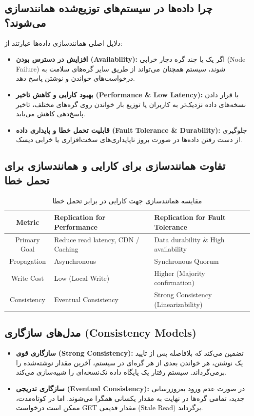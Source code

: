 \documentclass[12pt,a4paper]{article}
\begin{document}
\subsection{چرا داده‌ها در سیستم‌های توزیع‌شده همانندسازی می‌شوند؟}
دلایل اصلی همانندسازی داده‌ها عبارتند از:
\begin{itemize}
    \item \textbf{افزایش در دسترس بودن (Availability):} اگر یک یا چند گره دچار خرابی (Node Failure) شوند، سیستم همچنان می‌تواند از طریق سایر گره‌های سلامت به درخواست‌های خواندن و نوشتن پاسخ دهد.
    \item \textbf{بهبود کارایی و کاهش تاخیر (Performance \& Low Latency):} با قرار دادن نسخه‌های داده نزدیک‌تر به کاربران یا توزیع بار خواندن روی گره‌های مختلف، تاخیر پاسخ‌دهی کاهش می‌یابد.
    \item \textbf{قابلیت تحمل خطا و پایداری داده (Fault Tolerance \& Durability):} جلوگیری از دست رفتن داده‌ها در صورت بروز ناپایداری‌های سخت‌افزاری یا خرابی دیسک.
\end{itemize}

\subsection{تفاوت همانندسازی برای کارایی و همانندسازی برای تحمل خطا}
\begin{table}[H]
\centering
\caption{مقایسه همانندسازی جهت کارایی در برابر تحمل خطا}
\begin{latin}
\begin{tabular}{|c|p{5.5cm}|p{5.5cm}|}
\hline
\textbf{Metric} & \textbf{Replication for Performance} & \textbf{Replication for Fault Tolerance} \\
\hline
Primary Goal & Reduce read latency, CDN / Caching & Data durability \& High availability \\
Propagation & Asynchronous & Synchronous Quorum \\
Write Cost & Low (Local Write) & Higher (Majority confirmation) \\
Consistency & Eventual Consistency & Strong Consistency (Linearizability) \\
\hline
\end{tabular}
\end{latin}
\end{table}

\subsection{مدل‌های سازگاری (Consistency Models)}
\begin{itemize}
    \item \textbf{سازگاری قوی (Strong Consistency):} تضمین می‌کند که بلافاصله پس از تایید یک نوشتن، هر خواندن بعدی از هر گره‌ای در سیستم، آخرین مقدار نوشته‌شده را برمی‌گرداند. سیستم رفتار یک پایگاه داده تک‌نسخه‌ای را شبیه‌سازی می‌کند.
    \item \textbf{سازگاری تدریجی (Eventual Consistency):} در صورت عدم ورود به‌روزرسانی جدید، تمامی گره‌ها در نهایت به مقدار یکسانی همگرا می‌شوند. اما در کوتاه‌مدت، ممکن است درخواست GET مقدار قدیمی (Stale Read) برگرداند.
\end{itemize}
\end{document}
